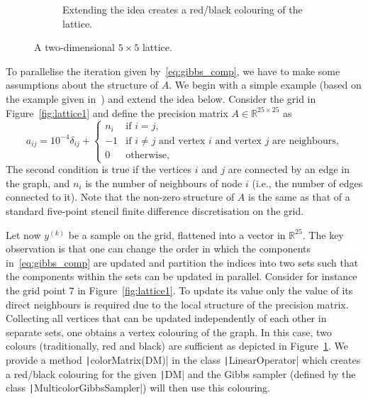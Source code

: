 \documentclass[
fontsize=11pt,
paper=a4,
numbers=noenddot
]{scrartcl}
\begin{document}
\begin{figure}
\begin{subfigure}[t]{.48\linewidth}
        \caption{Extending the idea creates a red/black colouring of the lattice.}\label{fig:lattice2}
    \end{subfigure}
    \caption{A two-dimensional $5 \times 5$ lattice.}\label{fig:lattice}
\end{figure}

To parallelise the iteration given by~\eqref{eq:gibbs_comp}, we have to make some assumptions about the structure of $A$. We begin with a simple example (based on the example given in~\cite*[Sec.~6.1]{foxparker}) and extend the idea below. Consider the grid in Figure~\ref{fig:lattice1} and define the precision matrix $A \in \mathbb{R}^{25 \times 25}$ as
\begin{equation*}
    a_{ij} = 10^{-4} \delta_{ij} + 
    \begin{cases}
        n_i & \text{if $i = j$,} \\
        -1 &  \text{if $i \neq j$ and vertex $i$ and vertex $j$ are neighbours,} \\
        0 & \text{otherwise,}
    \end{cases}
\end{equation*} 
The second condition is true if the vertices $i$ and $j$ are connected by an edge in the graph, and $n_i$ is the number of neighbours of node $i$ (i.e., the number of edges connected to it). Note that the non-zero structure of $A$ is the same as that of a standard five-point stencil finite difference discretisation on the grid.

Let now $y^{(k)}$ be a sample on the grid, flattened into a vector in $\mathbb{R}^{25}$. The key observation is that one can change the order in which the components in~\eqref{eq:gibbs_comp} are updated and partition the indices into two sets such that the components within the sets can be updated in parallel. Consider for instance the grid point $7$ in Figure~\ref{fig:lattice1}. To update its value only the value of its direct neighbours is required due to the local structure of the precision matrix. Collecting all vertices that can be updated independently of each other in separate sets, one obtains a vertex colouring of the graph. In this case, two colours (traditionally, red and black) are sufficient as depicted in Figure~\ref{fig:lattice2}. 
We provide a method \texttt|colorMatrix(DM)| in the class \texttt|LinearOperator| which creates a red/black colouring for the given \texttt|DM| and the Gibbs sampler (defined by the class \texttt|MulticolorGibbsSampler|) will then use this colouring.
\end{document}
